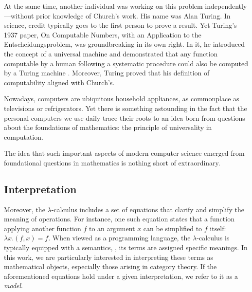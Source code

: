  At the same time, another individual was working on this problem independently—without prior knowledge of Church’s work. His name was Alan Turing. In science, credit typically goes to the first person to prove a result. Yet Turing’s 1937 paper, On Computable Numbers, with an Application to the Entscheidungsproblem, was groundbreaking in its own right. In it, he introduced the concept of a universal machine and demonstrated that any function computable by a human following a systematic procedure could also be computed by a Turing machine \cite{turingComputableNumbersApplication1937}. Moreover, Turing proved that his definition of computability aligned with Church’s.


Nowadays, computers are ubiquitous household appliances, as commonplace as televisions or refrigerators. Yet there is  something astounding in the fact that the personal computers we use daily trace their roots to an idea born from questions about the foundations of mathematics: the principle of universality in computation. 

The idea that such important aspects of modern computer science emerged from foundational questions in mathematics is nothing short of extraordinary.




\subsection*{Interpretation}

Moreover, the $\lambda$-calculus includes a set of equations that clarify and simplify the meaning of operations. For instance, one such equation states that a function applying another function $f$ to an argument $x$ can be simplified to $f$ itself: $\lambda x.(f, x) = f$. When viewed as a programming language, the $\lambda$-calculus is typically equipped with a  semantics, \ie, its terms are assigned specific meanings. In this work, we are particularly interested in interpreting these terms as mathematical objects, especially those arising in category theory. If the aforementioned equations hold under a given interpretation, we refer to it as a \emph{model}.

